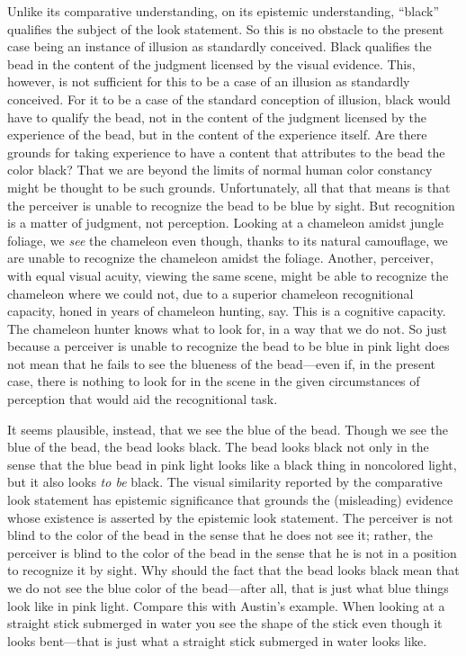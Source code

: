 \documentclass[12pt]{article}
\begin{document}
Unlike its comparative understanding, on its epistemic understanding, ``black'' qualifies the subject of the look statement. So this is no obstacle to the present case being an instance of illusion as standardly conceived. Black qualifies the bead in the content of the judgment licensed by the visual evidence. This, however, is not sufficient for this to be a case of an illusion as standardly conceived. For it to be a case of the standard conception of illusion, black would have to qualify the bead, not in the content of the judgment licensed by the experience of the bead, but in the content of the experience itself. Are there grounds for taking experience to have a content that attributes to the bead the color black? That we are beyond the limits of normal human color constancy might be thought to be such grounds. Unfortunately, all that that means is that the perceiver is unable to recognize the bead to be blue by sight. But recognition is a matter of judgment, not perception. Looking at a chameleon amidst jungle foliage, we \emph{see} the chameleon even though, thanks to its natural camouflage, we are unable to recognize the chameleon amidst the foliage. Another, perceiver, with equal visual acuity, viewing the same scene, might be able to recognize the chameleon where we could not, due to a superior chameleon recognitional capacity, honed in years of chameleon hunting, say. This is a cognitive capacity. The chameleon hunter knows what to look for, in a way that we do not. So just because a perceiver is unable to recognize the bead to be blue in pink light does not mean that he fails to see the blueness of the bead---even if, in the present case, there is nothing to look for in the scene in the given circumstances of perception that would aid the recognitional task.

It seems plausible, instead, that we see the blue of the bead. Though we see the blue of the bead, the bead looks black. The bead looks black not only in the sense that the blue bead in pink light looks like a black thing in noncolored light, but it also looks \emph{to be} black. The visual similarity reported by the comparative look statement has epistemic significance that grounds the (misleading) evidence whose existence is asserted by the epistemic look statement. The perceiver is not blind to the color of the bead in the sense that he does not see it; rather, the perceiver is blind to the color of the bead in the sense that he is not in a position to recognize it by sight. Why should the fact that the bead looks black mean that we do not see the blue color of the bead---after all, that is just what blue things look like in pink light. Compare this with Austin's \citeyear{Austin:1962lr} example. When looking at a straight stick submerged in water you see the shape of the stick even though it looks bent---that is just what a straight stick submerged in water looks like. 
\end{document}
